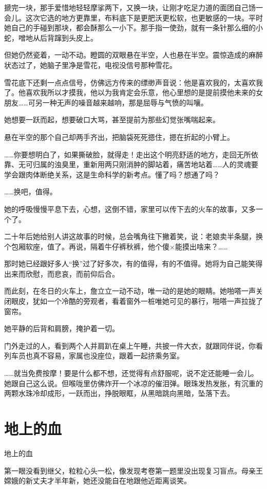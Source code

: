 \documentclass[lang=cn,newtx,12pt,scheme=chinese]{elegantbook}
\begin{document}
搋完一块，那手爱惜地轻轻摩挲两下，又换一块，让刚才吃足力道的面团自己饧一会儿。这次它选的地方更靠里，布料底下是更肥沃更松软，也更敏感的一块。平时她自己的手碰到那块，都会酥那么一小下。那手指一使劲，就有一条针那么细的小蛇，噌地从后背蹿到头皮上。

但她仍然瓷着，一动不动。瞪圆的双眼悬在半空，人也悬在半空。震惊造成的麻醉状态过了，她脑子里净是雪花，电视没信号那种雪花。

雪花底下还剩一点点信号，仿佛远方传来的缥缈声音说：他是喜欢我的，太喜欢我了。他喜欢我所以才摸我，他以为我肯定会乐意，他心里想的是提前摸他未来的女朋友……可另一种无声的噪音越来越响，那是屈辱与气愤的叫嚷。

她想要一跃而起，想要破口大骂，甚至提前为那些幻觉张嘴喘起来。

悬在半空的那个自己却两手齐出，把脑袋死死摁住，摁在折起的小臂上。

……你要想明白了，如果撕破脸，就得走！走出这个明亮舒适的地方，走回无所依靠、无可归属的浊臭里，重新用两只刚消肿的脚站着，痛苦地站着……人的灵魂要学会跟肉体断绝关系，这是生命科学的新考点。懂了吗？想通了吗？

……换吧，值得。

她的呼吸慢慢平息下去，心想，这倒不错，家里可以传下去的火车的故事，又多一个了。

二十年后她给别人讲这故事的时候，总会嘴角往下撇着笑，说：老娘卖半条腿，换个包厢软座，值了。再说，隔着牛仔裤秋裤，他个傻×能摸出啥来？……

那时她已经跟好多人“换”过了好多次，有的值得，有的不值得。她将为自己能笑得出来而欣慰，而悲哀，而前仰后合。

而此刻，在冬日的火车上，詹立立一动不动，唯一动的是她的眼睛。她啪嗒一声关闭眼皮，犹如一个冷酷的旁观者，看着窗外一桩唯她可见的暴行，啪嗒一声拉拢了窗帘。

她平静的后背和肩膀，掩护着一切。

门外走过的人，看到两个人并肩趴在桌上午睡，共披一件大衣，就跟同伴说，你看列车员也真不容易，家属也没座位，跟着一起挤乘务室。

……就当免费按摩！要是什么都不想，还觉得有点舒服呢，说不定还能睡一会儿。她跟自己这么说。但喉咙里仿佛炸开一个冰凉的催泪弹。眼珠发热发胀，有沉重的两颗水珠冷却成形，一跃而出，挣脱眼眶，从黑暗跳向黑暗，坠落下去。
\chapter{地上的血}
地上的血


第一眼没看到继父，粒粒心头一松，像发现考卷第一题里没出现复习盲点。母亲王嫦娥的新丈夫才半年新，她还没能自在地跟他近距离谈笑。
\end{document}
